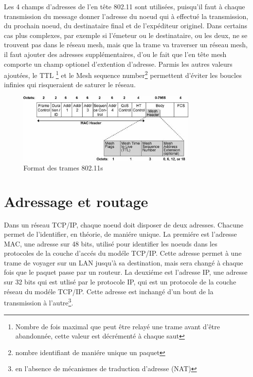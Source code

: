 Les 4 champs d'adresses de l'en tête 802.11 sont utilisées, puisqu'il faut à chaque transmission du message donner l'adresse
du noeud qui à effectué la transmission, du prochain noeud, du destinataire final et de l'expéditeur originel. Dans certains cas
plus complexes, par exemple si l'émeteur ou le destinataire, ou les deux, ne se trouvent pas dans le réseau mesh, mais que la 
trame va traverser un réseau mesh, il faut ajouter des adresses supplémentaires, d'ou le fait que l'en tête mesh comporte un 
champ optionel d'extention d'adresse. Parmis les autres valeurs ajoutées, le TTL \footnote{Nombre de fois maximal que peut être
relayé une trame avant d'être abandonnée, cette valeur est décrémenté à chaque saut} et le Mesh sequence number\footnote{nombre
identifiant de maniére unique un paquet} permettent d'éviter les boucles infinies qui risqueraient de saturer le réseau.


\begin{figure}
   \centering
   \includegraphics[width=0.8\textwidth,natwidth=488,natheight=513]{images/mesh_header.jpeg}
   \caption{Format des trames 802.11s}
\end{figure}

\section{Adressage et routage}

Dans un réseau TCP/IP, chaque noeud doit disposer de deux adresses. Chacune permet de l'identifier, en théorie, de maniére 
unique. La premiére est l'adresse MAC, une adresse sur 48 bits, utilisé pour identifier les noeuds dans les protocoles de la 
couche d'accés du modéle TCP/IP. Cette adresse permet à une trame de voyager sur un LAN jusqu'à sa destination, mais sera changé
à chaque fois que le paquet passe par un routeur. La deuxiéme est l'adresse IP, une adresse sur 32 bits qui est utlisé par le
protocole IP, qui est un protocole de la couche réseau du modéle TCP/IP. Cette adresse est inchangé d'un bout de la transmission
à l'autre\footnote{en l'absence de mécanismes de traduction d'adresse (NAT)}.

